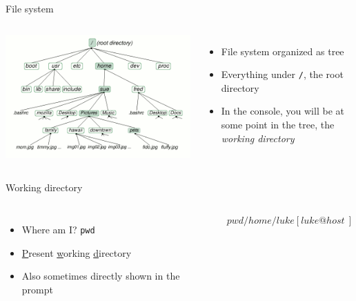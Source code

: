     \begin{frame}[t,fragile]{File system}
        \begin{columns}[T]
            \includegraphics[width=\columnwidth]{img/dirtree.png}
            \begin{itemize}
                \item File system organized as tree
                \item Everything under \texttt{/}, the root directory
                \item In the console, you will be at some point in the tree,
                    the \emph{working directory}
            \end{itemize}
        \end{columns}
    \end{frame}

    \begin{frame}[t,fragile]{Working directory}
        \begin{columns}[T]
            \begin{itemize}
                \item Where am I? \textrightarrow \: \texttt{pwd}
                \item \underline{P}resent \underline{w}orking \underline{d}irectory
                \item Also sometimes directly shown in the prompt
            \end{itemize}
            \begin{bashenv}$ pwd
/home/luke
[luke@host ~]$
            \end{bashenv}
        \end{columns}
    \end{frame}

